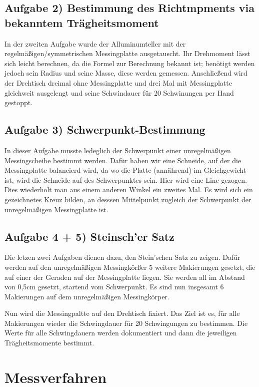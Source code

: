 \subsection*{Aufgabe 2) Bestimmung des Richtmpments via bekanntem Trägheitsmoment}
In der zweiten Aufgabe wurde der Alluminumteller mit der regelmäßigen/symmetrischen Messingplatte ausgetauscht. 
Ihr Drehmoment lässt sich leicht berechnen, da die Formel zur Berechnung bekannt ist; 
benötigt werden jedoch sein Radius und seine Masse, diese werden gemessen. 
Anschließend wird der Drehtisch dreimal ohne Messingplatte und drei Mal mit Messingplatte gleichweit ausgelengt 
und seine Schwindauer für 20 Schwinungen per Hand gestoppt. 

\subsection*{Aufgabe 3) Schwerpunkt-Bestimmung}
In dieser Aufgabe musste ledeglich der Schwerpunkt einer unregelmäßigen Messingscheibe bestimmt werden.
Dafür haben wir eine Schneide, auf der die Messingplatte balancierd wird, da wo die Platte (annährend) im Gleichgewicht ist,
wird die Schneide auf des Schwerpunktes sein. Hier wird eine Line gezogen. Dies wiederholt man aus einem anderen Winkel ein zweites Mal.
Es wird sich ein gezeichnetes Kreuz bilden, an desssen Mittelpunkt zugleich der Schwerpunkt der unregelmäßigen Messingplatte ist.

\subsection*{Aufgabe 4 + 5) Steinsch'er Satz}
Die letzen zwei Aufgaben dienen dazu, den Stein'schen Satz zu zeigen. Dafür werden auf den unregelmäßigen Messingkörßer
5 weitere Makierungen gesetzt, die auf einer der Geraden auf der Messingplatte liegen. Sie werden all im Abstand von 0,5cm gesetzt, startend vom Schwerpunkt.
Es sind nun insgesamt 6 Makierungen auf dem unregelmäßigen Messingkörper. 

Nun wird die Messingpaltte auf den Drehtisch fixiert. 
Das Ziel ist es, für alle Makierungen wieder die Schwingdauer für 20 Schwingungen zu bestimmen. 
Die Werte für alle Schwingdauern werden dokumentiert und dann die jeweiligen Trägheitsmomente bestimmt.

\section{Messverfahren}
